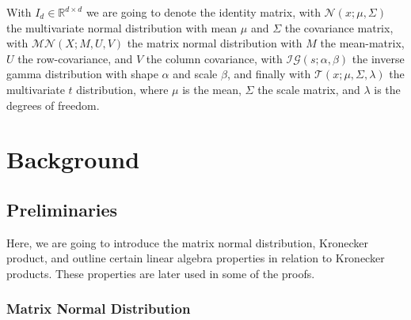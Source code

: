 \documentclass{mldsmsc}
\begin{document}
\noindent With $I_d \in \mathbb{R}^{d \times d}$ we are going to denote the identity matrix, with $\mathcal{N}(x; \mu, \Sigma)$ the multivariate normal distribution with mean $\mu$ and $\Sigma$ the covariance matrix, with $\mathcal{MN}(X; M, U, V)$ the matrix normal distribution with $M$ the mean-matrix, $U$ the row-covariance, and $V$ the column covariance, with  $\mathcal{IG}(s; \alpha, \beta)$ the inverse gamma distribution with shape $\alpha$ and scale $\beta$, and finally with $\mathcal{T}(x; \mu, \Sigma, \lambda)$ the multivariate $t$ distribution, where $\mu$ is the mean, $\Sigma$ the scale matrix, and $\lambda$ is the degrees of freedom. \newline




\chapter{Background}

\section{Preliminaries}

Here, we are going to introduce the matrix normal distribution, Kronecker product, and outline certain linear algebra properties in relation to Kronecker products. These properties are later used in some of the proofs.

\subsection{Matrix Normal Distribution}
\end{document}
